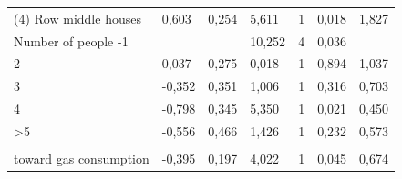 \documentclass[preprint,12pt,3p]{elsarticle}
\begin{document}
\begin{footnotesize}
\begin{longtable}[c]{@{}lllllll@{}}
(4) Row middle houses                                                                                                                  & 0,603  & 0,254 & 5,611  & 1  & 0,018 & 1,827  \\
Number of people -1                                                                                                                    &        &       & 10,252 & 4  & 0,036 &        \\
2                                                                                                                                      & 0,037  & 0,275 & 0,018  & 1  & 0,894 & 1,037  \\
3                                                                                                                                      & -0,352 & 0,351 & 1,006  & 1  & 0,316 & 0,703  \\
4                                                                                                                                      & -0,798 & 0,345 & 5,350  & 1  & 0,021 & 0,450  \\
\textgreater{}5                                                                                                                        & -0,556 & 0,466 & 1,426  & 1  & 0,232 & 0,573  \\
\begin{tabular}[c]{@{}l@{}}Change in behaviour\\ toward gas consumption\end{tabular}                                                   & -0,395 & 0,197 & 4,022  & 1  & 0,045 & 0,674  \\


\end{longtable}
\end{footnotesize}
\end{document}
